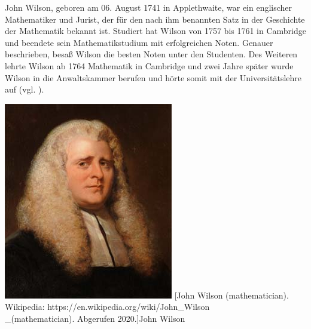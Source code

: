 \begin{minipage}{0.65\linewidth}
John Wilson, geboren am 06. August 1741 in Applethwaite,
war ein englischer Mathematiker und Jurist, der für den
nach ihm benannten Satz in der Geschichte der Mathematik
bekannt ist. Studiert hat Wilson von 1757 bis 1761 in
Cambridge und beendete sein Mathematikstudium mit
erfolgreichen Noten. Genauer beschrieben, besaß Wilson
die besten Noten unter den Studenten. Des Weiteren
lehrte Wilson ab 1764 Mathematik in Cambridge und zwei
Jahre später wurde Wilson in die Anwaltskammer berufen
und hörte somit mit der Universitätslehre auf
(vgl. \cite{oconnor_wilson}).
\end{minipage}
\hfil
\begin{minipage}[r]{0.3\linewidth}
  \captionsetup{type=figure,font=small,skip=6pt,format=plain}%
  \capstart
  \includegraphics[width=1.0\linewidth]{./images/john_wilson.jpeg}
  [John Wilson (mathematician). Wikipedia: https://en.wikipedia.org/wiki/John\_Wilson\\
                    \_(mathematician). Abgerufen 2020.]{John Wilson}
  \label{fig:portrait_wilson}
\end{minipage}
\vspace{.3cm}

